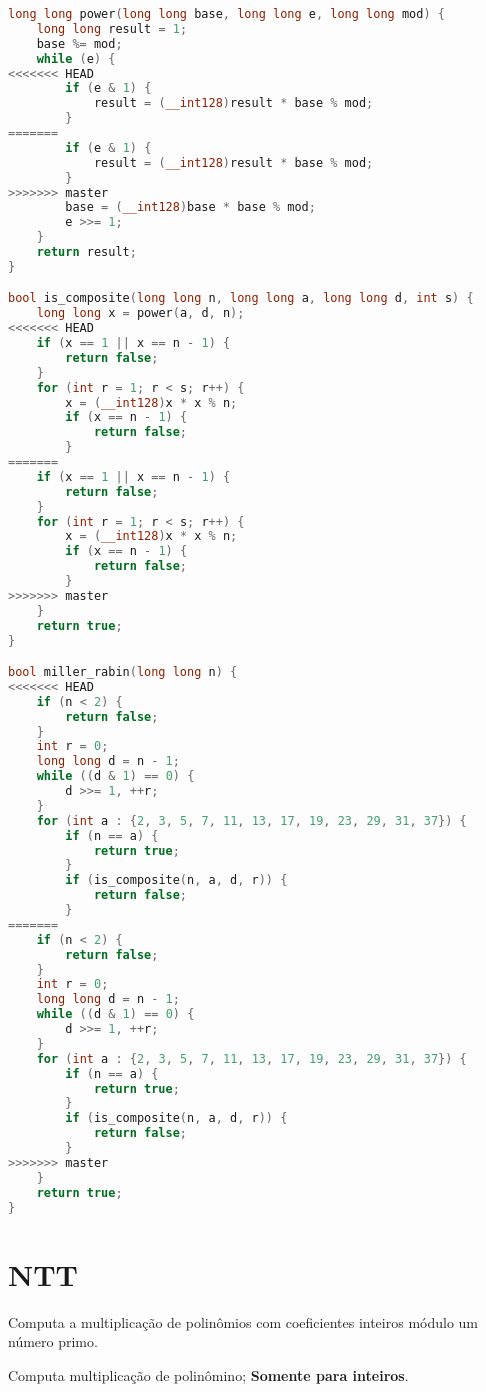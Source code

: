 \documentclass[11pt, a4paper, oneside]{book}
\begin{document}
\hfill

\begin{multicols}{2}
\begin{lstlisting}[language=C++]
long long power(long long base, long long e, long long mod) {
    long long result = 1;
    base %= mod;
    while (e) {
<<<<<<< HEAD
        if (e & 1) {
            result = (__int128)result * base % mod;
        }
=======
        if (e & 1) {
            result = (__int128)result * base % mod;
        }
>>>>>>> master
        base = (__int128)base * base % mod;
        e >>= 1;
    }
    return result;
}

bool is_composite(long long n, long long a, long long d, int s) {
    long long x = power(a, d, n);
<<<<<<< HEAD
    if (x == 1 || x == n - 1) {
        return false;
    }
    for (int r = 1; r < s; r++) {
        x = (__int128)x * x % n;
        if (x == n - 1) {
            return false;
        }
=======
    if (x == 1 || x == n - 1) {
        return false;
    }
    for (int r = 1; r < s; r++) {
        x = (__int128)x * x % n;
        if (x == n - 1) {
            return false;
        }
>>>>>>> master
    }
    return true;
}

bool miller_rabin(long long n) {
<<<<<<< HEAD
    if (n < 2) {
        return false;
    }
    int r = 0;
    long long d = n - 1;
    while ((d & 1) == 0) {
        d >>= 1, ++r;
    }
    for (int a : {2, 3, 5, 7, 11, 13, 17, 19, 23, 29, 31, 37}) {
        if (n == a) {
            return true;
        }
        if (is_composite(n, a, d, r)) {
            return false;
        }
=======
    if (n < 2) {
        return false;
    }
    int r = 0;
    long long d = n - 1;
    while ((d & 1) == 0) {
        d >>= 1, ++r;
    }
    for (int a : {2, 3, 5, 7, 11, 13, 17, 19, 23, 29, 31, 37}) {
        if (n == a) {
            return true;
        }
        if (is_composite(n, a, d, r)) {
            return false;
        }
>>>>>>> master
    }
    return true;
}
\end{lstlisting}
\end{multicols}

\hfill

\section{NTT}


Computa a multiplicação de polinômios com coeficientes inteiros módulo um número primo.



Computa multiplicação de polinômino; \textbf{Somente para inteiros}.
\end{document}
